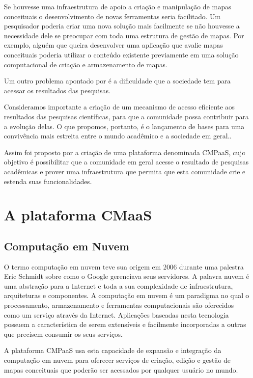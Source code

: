 \documentclass[
	12pt,				%
	openright,			%
	oneside,			%
	a4paper,			%
	english,			%
	french,				%
	spanish,			%
	brazil				%
	]{abntex2}
\begin{document}
Se houvesse uma infraestrutura de apoio a criação e manipulação de mapas conceituais o desenvolvimento de novas ferramentas seria facilitado. Um pesquisador poderia criar uma nova solução mais facilmente se não houvesse a necessidade dele se preocupar com toda uma estrutura de gestão de mapas. Por exemplo, alguém que queira desenvolver uma aplicação que avalie mapas conceituais poderia utilizar o conteúdo existente previamente em uma solução computacional de criação e armazenamento de mapas.

Um outro problema apontado por  é a dificuldade que a sociedade tem para acessar os resultados das pesquisas.
\begin{citacao}
	Consideramos importante a criação de um mecanismo de
	acesso eficiente aos resultados das pesquisas científicas, para que a comunidade possa contribuir para a evolução delas. O que propomos, portanto, é o lançamento de bases para uma convivência mais estreita entre o mundo acadêmico e a sociedade em geral.\cite{Perin2014}.
\end{citacao}

Assim foi proposto por  a criação de uma plataforma denominada CMPaaS, cujo objetivo é possibilitar que a comunidade em geral acesse o resultado de pesquisas acadêmicas e prover uma infraestrutura que permita que esta comunidade crie e estenda suas funcionalidades.

\section{A plataforma CMaaS}

\subsection{Computação em Nuvem}

O termo computação em nuvem teve sua origem em 2006 durante uma palestra Eric Schmidt sobre como o Google gerenciava seus servidores\cite{taurion2009}. A palavra nuvem é uma abstração para a Internet e toda a sua complexidade de infraestrutura, arquiteturas e componentes. A computação em nuvem é um paradigma no qual o processamento, armazenamento e ferramentas computacionais são oferecidos como um serviço através da Internet. Aplicações baseadas nesta tecnologia possuem a característica de serem extensíveis e facilmente incorporadas a outras que precisem consumir os seus serviços\cite{Perin2014}.

A plataforma CMPaaS usa esta capacidade de expansão e integração da computação em nuvem para oferecer serviços de criação, edição e gestão de mapas conceituais que poderão ser acessados por qualquer usuário no mundo.
\end{document}
